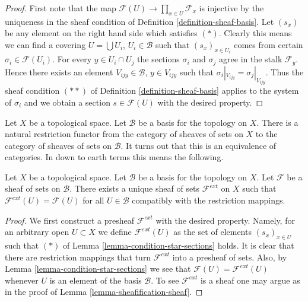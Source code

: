 \begin{proof}
First note that the map
$\mathcal{F}(U) \to \prod\nolimits_{x \in U} \mathcal{F}_x$
is injective by the uniqueness in the sheaf condition
of Definition \ref{definition-sheaf-basis}. Let $(s_x)$ be
any element on the right hand side which satisfies $(*)$.
Clearly this means we can find a covering $U = \bigcup U_i$,
$U_i \in \mathcal{B}$ such that $(s_x)_{x \in U_i}$ comes from
certain $\sigma_i \in \mathcal{F}(U_i)$. For every $y \in U_i \cap U_j$
the sections $\sigma_i$ and $\sigma_j$ agree in the stalk
$\mathcal{F}_y$. Hence there exists an element $V_{ijy} \in \mathcal{B}$,
$y \in V_{ijy}$ such that $\sigma_i|_{V_{ijy}} = \sigma_j|_{V_{ijy}}$.
Thus the sheaf condition $(**)$ of Definition \ref{definition-sheaf-basis}
applies to the system of $\sigma_i$ and we obtain a section
$s \in \mathcal{F}(U)$ with the desired property.
\end{proof}

\noindent
Let $X$ be a topological space.
Let $\mathcal{B}$ be a basis for the topology on $X$.
There is a natural restriction functor from the category
of sheaves of sets on $X$ to the category of sheaves of
sets on $\mathcal{B}$. It turns out that this is an equivalence
of categories. In down to earth terms this means the following.

\begin{lemma}
\label{lemma-extend-off-basis}
Let $X$ be a topological space.
Let $\mathcal{B}$ be a basis for the topology on $X$.
Let $\mathcal{F}$ be a sheaf of sets on $\mathcal{B}$.
There exists a unique sheaf of sets $\mathcal{F}^{ext}$
on $X$ such that $\mathcal{F}^{ext}(U) = \mathcal{F}(U)$
for all $U \in \mathcal{B}$ compatibly with the restriction
mappings.
\end{lemma}

\begin{proof}
We first construct a presheaf $\mathcal{F}^{ext}$ with the
desired property. Namely, for an arbitrary open $U \subset X$ we
define $\mathcal{F}^{ext}(U)$ as the set of elements
$(s_x)_{x \in U}$ such that $(*)$ of
Lemma \ref{lemma-condition-star-sections} holds.
It is clear that there are restriction mappings
that turn $\mathcal{F}^{ext}$ into a presheaf of sets.
Also, by Lemma \ref{lemma-condition-star-sections} we
see that $\mathcal{F}(U) = \mathcal{F}^{ext}(U)$
whenever $U$ is an element of the basis $\mathcal{B}$.
To see $\mathcal{F}^{ext}$ is a sheaf one may
argue as in the proof of Lemma \ref{lemma-sheafification-sheaf}.
\end{proof}

